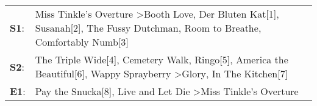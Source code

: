 \begin{supertabular}{p{0.03\textwidth}p{0.92\textwidth}}
 \textbf{S1}:  &  Miss Tinkle's Overture\textsuperscript{} \textgreater \enspace Booth Love\textsuperscript{}, \enspace Der Bluten Kat[1]\textsuperscript{}, \enspace Susanah[2]\textsuperscript{}, \enspace The Fussy Dutchman\textsuperscript{}, \enspace Room to Breathe\textsuperscript{}, \enspace Comfortably Numb[3]\textsuperscript{}  \enspace  \\
 \textbf{S2}:  &            The Triple Wide[4]\textsuperscript{}, \enspace Cemetery Walk\textsuperscript{}, \enspace Ringo[5]\textsuperscript{}, \enspace America the Beautiful[6]\textsuperscript{}, \enspace Wappy Sprayberry\textsuperscript{} \textgreater \enspace Glory\textsuperscript{}, \enspace In The Kitchen[7]\textsuperscript{}  \enspace  \\
 \textbf{E1}:  &                                                                                                                                                                              Pay the Snucka[8]\textsuperscript{}, \enspace Live and Let Die\textsuperscript{} \textgreater \enspace Miss Tinkle's Overture\textsuperscript{}  \enspace  \\
\end{supertabular}
